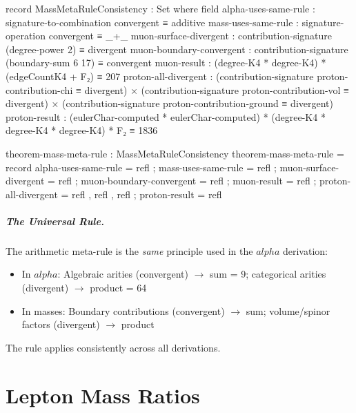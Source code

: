 \documentclass[11pt,a4paper]{book}
\def\alpha{alpha}%
\begin{document}
\begin{code}
record MassMetaRuleConsistency : Set where
  field
    alpha-uses-same-rule     : signature-to-combination convergent ≡ additive
    mass-uses-same-rule      : signature-operation convergent ≡ _+_
    muon-surface-divergent   : contribution-signature (degree-power 2) ≡ divergent
    muon-boundary-convergent : contribution-signature (boundary-sum 6 17) ≡ convergent
    muon-result              : (degree-K4 * degree-K4) * (edgeCountK4 + F₂) ≡ 207
    proton-all-divergent     : (contribution-signature proton-contribution-chi ≡ divergent) ×
                               (contribution-signature proton-contribution-vol ≡ divergent) ×
                               (contribution-signature proton-contribution-ground ≡ divergent)
    proton-result            : (eulerChar-computed * eulerChar-computed) * (degree-K4 * degree-K4 * degree-K4) * F₂ ≡ 1836

theorem-mass-meta-rule : MassMetaRuleConsistency
theorem-mass-meta-rule = record
  { alpha-uses-same-rule     = refl
  ; mass-uses-same-rule      = refl
  ; muon-surface-divergent   = refl
  ; muon-boundary-convergent = refl
  ; muon-result              = refl
  ; proton-all-divergent     = refl , refl , refl
  ; proton-result            = refl
  }
\end{code}

\paragraph{The Universal Rule.}

The arithmetic meta-rule is the \emph{same} principle used in the $\alpha$ derivation:
\begin{itemize}
\item In $\alpha$: Algebraic arities (convergent) $\to$ sum = 9; categorical arities (divergent) $\to$ product = 64
\item In masses: Boundary contributions (convergent) $\to$ sum; volume/spinor factors (divergent) $\to$ product
\end{itemize}

The rule applies consistently across all derivations.

\chapter{Lepton Mass Ratios}
\label{chap:lepton-masses}
\end{document}

